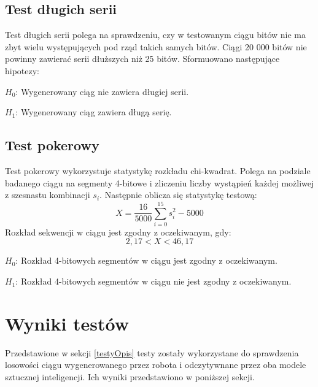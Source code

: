 \subsection{Test długich serii}
Test długich serii polega na sprawdzeniu, czy w testowanym ciągu bitów nie ma zbyt wielu występujących pod rząd takich 
samych bitów. Ciągi 20 000 bitów nie powinny zawierać serii dłuższych niż 25 bitów. Sformuowano następujące hipotezy:
\par \begin{math} H_0 \end{math}: Wygenerowany ciąg nie zawiera długiej serii.
\par \begin{math} H_1 \end{math}: Wygenerowany ciąg zawiera długą serię.

\subsection{Test pokerowy}
\label{pokerowyOpis}
Test pokerowy wykorzystuje statystykę rozkładu chi-kwadrat. Polega na podziale badanego ciągu na segmenty 4-bitowe i 
zliczeniu liczby wystąpień każdej możliwej z szesnastu kombinacji \begin{math}s_i\end{math}. Następnie oblicza się 
statystykę testową:
\begin{displaymath}
    X = \frac{16}{5000} \sum^{15}_{i=0} s_i^2 - 5000
\end{displaymath}
Rozkład sekwencji w ciągu jest zgodny z oczekiwanym, gdy:
\begin{displaymath}
    2{,}17 < X < 46{,}17
\end{displaymath}
\par \begin{math} H_0 \end{math}: Rozkład 4-bitowych segmentów w ciągu jest zgodny z oczekiwanym.
\par \begin{math} H_1 \end{math}: Rozkład 4-bitowych segmentów w ciągu nie jest zgodny z oczekiwanym.



\section{Wyniki testów}
Przedstawione w sekcji \ref{testyOpis} testy zostały wykorzystane do sprawdzenia losowości ciągu wygenerowanego przez robota i 
odczytywnane przez oba modele sztucznej inteligencji. Ich wyniki przedstawiono w poniższej sekcji.
